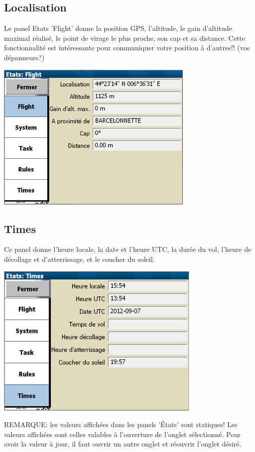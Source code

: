 \subsection*{Localisation}
Le panel Etats 'Flight' donne la position GPS, l'altitude, le gain d'altitude maximal réalisé, le point de virage le plus proche, son cap et sa distance. Cette fonctionnalité est intéressante pour communiquer votre position à d'autres!! (vos dépanneurs?)
\begin{center}
\includegraphics[angle=0,width=0.7\linewidth,keepaspectratio='true']{figures/status-flight.png}
\end{center}

\subsection*{Times}
Ce panel donne l'heure locale, la date et l'heure UTC, la durée du vol, l'heure de décollage et d'atterrissage, et le coucher du soleil.
\begin{center}
\includegraphics[angle=0,width=0.7\linewidth,keepaspectratio='true']{figures/status-times.png}
\end{center}
REMARQUE: les valeurs affichées dans les panels 'États' sont statiques! Les valeurs affichées sont celles valables à l'ouverture de l'onglet sélectionné. Pour avoir la valeur à jour, il faut ouvrir un autre onglet et réouvrir l'onglet désiré.

